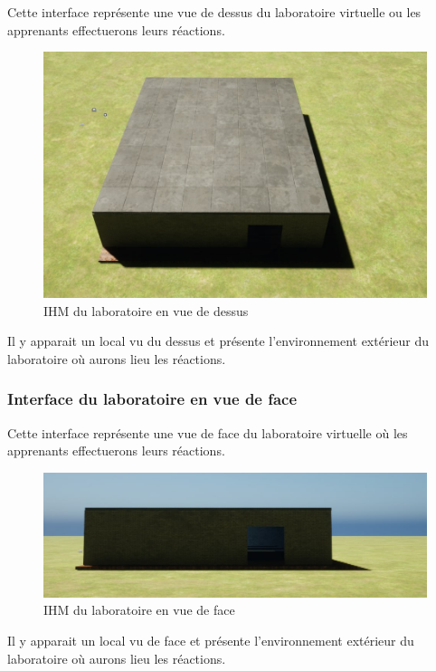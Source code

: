 Cette interface représente une vue de dessus du laboratoire virtuelle ou les apprenants effectuerons leurs réactions.

\begin{figure}[H]
	\centering
	\includegraphics[width=1\textwidth]{img/labot}
	\caption{IHM du laboratoire en vue de dessus}
	\label{fig:mesh1}
\end{figure}

Il y apparait un local vu du dessus et présente l'environnement extérieur du laboratoire où aurons lieu les réactions.

\subsubsection{Interface du laboratoire en vue de face}

Cette interface représente une vue de face du laboratoire virtuelle où les apprenants effectuerons leurs réactions.

\begin{figure}[H]
	\centering
	\includegraphics[width=1\textwidth]{img/labof}
	\caption{IHM du laboratoire en vue de face}
	\label{fig:mesh1}
\end{figure}

Il y apparait un local vu de face et présente l'environnement extérieur du laboratoire où aurons lieu les réactions.

